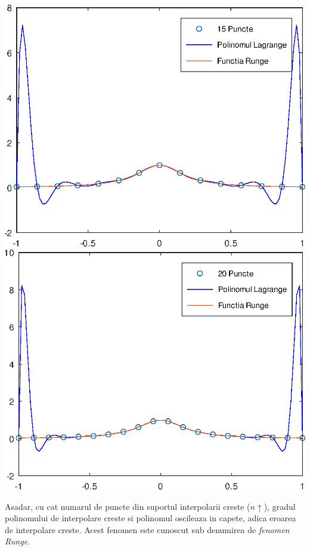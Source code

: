 \documentclass{article}
\begin{document}
\begin{center}
    \includegraphics[scale=0.5]{runge_15points}
    \hspace{0.5cm}\vspace{0.25cm}
    \includegraphics[scale=0.5]{runge_20points}
\end{center}

Asadar, cu cat numarul de puncte din suportul interpolarii creste ($n \uparrow$), gradul polinomului de interpolare creste si polinomul oscileaza in capete, adica eroarea de interpolare creste. Acest fenomen este cunoscut sub denumirea de \textit{fenomen Runge}.  \\
\end{document}
